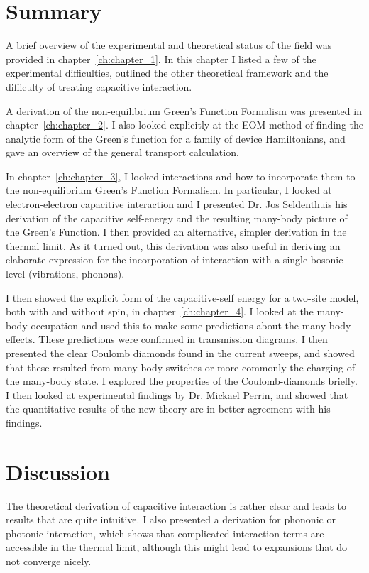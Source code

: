 \section{Summary}
\label{sec:summary}
A brief overview of the experimental and theoretical status of the field was provided in chapter~\ref{ch:chapter_1}. In this chapter I listed a few of the experimental difficulties, outlined the other theoretical framework and the difficulty of treating capacitive interaction.

A derivation of the non-equilibrium Green's Function Formalism was presented in chapter~\ref{ch:chapter_2}. I also looked explicitly at the EOM method of finding the analytic form of the Green's function for a family of device Hamiltonians, and gave an overview of the general transport calculation.

In chapter~\ref{ch:chapter_3}, I looked interactions and how to incorporate them to the non-equilibrium Green's Function Formalism. In particular, I looked at electron-electron capacitive interaction and I presented Dr. Jos Seldenthuis his derivation of the capacitive self-energy and the resulting many-body picture of the Green's Function. I then provided an alternative, simpler derivation in the thermal limit. As it turned out, this derivation was also useful in deriving an elaborate expression for the incorporation of interaction with a single bosonic level (vibrations, phonons). 

I then showed the explicit form of the capacitive-self energy for a two-site model, both with and without spin, in chapter~\ref{ch:chapter_4}. I looked at the many-body occupation and used this to make some predictions about the many-body effects. These predictions were confirmed in transmission diagrams. I then presented the clear Coulomb diamonds found in the current sweeps, and showed that these resulted from many-body switches or more commonly the charging of the many-body state. I explored the properties of the Coulomb-diamonds briefly. I then looked at experimental findings by Dr. Mickael Perrin, and showed that the quantitative results of the new theory are in better agreement with his findings. 
\section{Discussion}
\label{sec:discussion}
The theoretical derivation of capacitive interaction is rather clear and leads to results that are quite intuitive. I also presented a derivation for phononic or photonic interaction, which shows that complicated interaction terms are accessible in the thermal limit, although this might lead to expansions that do not converge nicely.

